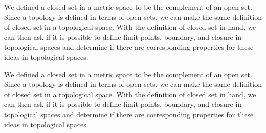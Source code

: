 \label{sec:Closure_interior_topology}


\vspace*{-17 pt}

\vspace*{13 pt}

We defined a closed set in a metric space to be the complement of an open set. Since a topology is defined in terms of open sets, we can make the same definition of closed set in a topological space. With the definition of closed set in hand, we can then ask if it is possible to define limit points, boundary, and closure in topological spaces and determine if there are corresponding properties for these ideas in topological spaces. 

We defined a closed set in a metric space to be the complement of an open set. Since a topology is defined in terms of open sets, we can make the same definition of closed set in a topological space. With the definition of closed set in hand, we can then ask if it is possible to define limit points, boundary, and closure in topological spaces and determine if there are corresponding properties for these ideas in topological spaces. 

